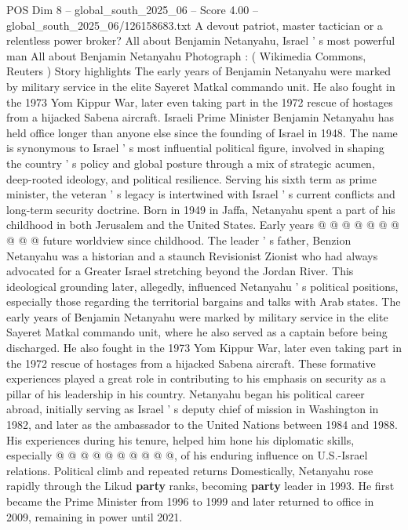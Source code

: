 \begin{textsample}{POS Dim 8 – global\_south\_2025\_06 – Score 4.00 – global\_south\_2025\_06/126158683.txt}  \label{ex:f8_pos_422}
A devout patriot, master tactician or a relentless power broker?
All about Benjamin Netanyahu, Israel ' s most powerful man All about Benjamin Netanyahu Photograph : ( Wikimedia Commons, Reuters ) Story highlights The early years of Benjamin Netanyahu were marked by military service in the elite Sayeret Matkal commando unit.
He also fought in the 1973 Yom Kippur War, later even taking part in the 1972 rescue of hostages from a hijacked Sabena aircraft.
Israeli Prime Minister Benjamin Netanyahu has held office longer than anyone else since the founding of Israel in 1948.
The name is synonymous to Israel ' s most influential political figure, involved in shaping the country ' s policy and global posture through a mix of strategic acumen, deep-rooted ideology, and political resilience.
Serving his sixth term as prime minister, the veteran ' s legacy is intertwined with Israel ' s current conflicts and long-term security doctrine.
Born in 1949 in Jaffa, Netanyahu spent a part of his childhood in both Jerusalem and the United States.
Early years @ @ @ @ @ @ @ @ @ @ future worldview since childhood.
The leader ' s father, Benzion Netanyahu was a historian and a staunch Revisionist Zionist who had always advocated for a Greater Israel stretching beyond the Jordan River.
This ideological grounding later, allegedly, influenced Netanyahu ' s political positions, especially those regarding the territorial bargains and talks with Arab states.
The early years of Benjamin Netanyahu were marked by military service in the elite Sayeret Matkal commando unit, where he also served as a captain before being discharged.
He also fought in the 1973 Yom Kippur War, later even taking part in the 1972 rescue of hostages from a hijacked Sabena aircraft.
These formative experiences played a great role in contributing to his emphasis on security as a pillar of his leadership in his country.
Netanyahu began his political career abroad, initially serving as Israel ' s deputy chief of mission in Washington in 1982, and later as the ambassador to the United Nations between 1984 and 1988.
His experiences during his tenure, helped him hone his diplomatic skills, especially @ @ @ @ @ @ @ @ @ @, of his enduring influence on U.S.-Israel relations.
Political climb and repeated returns Domestically, Netanyahu rose rapidly through the Likud \textbf{party} ranks, becoming \textbf{party} leader in 1993.
He first became the Prime Minister from 1996 to 1999 and later returned to office in 2009, remaining in power until 2021.

\end{textsample}

